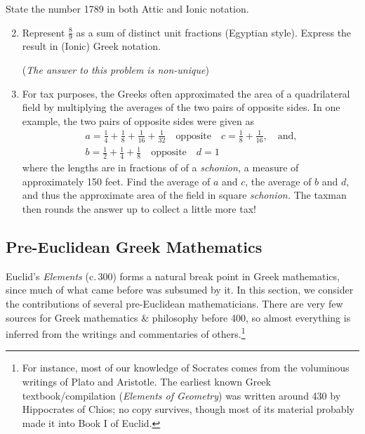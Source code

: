 \begin{exercises}{}{}
	\exstart State the number 1789 in both Attic and Ionic notation.
	\begin{enumerate}\setcounter{enumi}{1}
	  \item%
	  Represent $\frac 89$ as a sum of distinct unit fractions (Egyptian style). Express the result in (Ionic) Greek notation.\par
	  (\emph{The answer to this problem is non-unique})
	  
	  \item%
	  For tax purposes, the Greeks often approximated the area of a quadrilateral field by multiplying the averages of the two pairs of opposite sides. In one example, the two pairs of opposite sides were given as
	  \begin{gather*}
	  a=\frac 14+\frac 18+\frac 1{16}+\frac 1{32}\quad\text{opposite}\quad c=\frac 18+\frac 1{16},\quad\text{and,}\\
	  b=\frac 12+\frac 14+\frac 18\quad\text{opposite}\quad d=1
	  \end{gather*}
	  where the lengths are in fractions of of a \emph{schonion,} a measure of approximately 150 feet. Find the average of $a$ and $c$, the average of $b$ and $d$, and thus the approximate area of the field in square \emph{schonion.} The taxman then rounds the answer up to collect a little more tax!
	\end{enumerate}
\end{exercises}

\clearpage



\subsection{Pre-Euclidean Greek Mathematics}

Euclid's \emph{Elements} (c.\,300\BC) forms a natural break point in Greek mathematics, since much of what came before was subsumed by it. In this section, we consider the contributions of several pre-Euclidean mathematicians. There are very few sources for Greek mathematics \& philosophy before 400\BC{}, so almost everything is inferred from the writings and commentaries of others.\footnote{For instance, most of our knowledge of Socrates comes from the voluminous writings of Plato and Aristotle. The earliest known Greek textbook/compilation (\emph{Elements of Geometry}) was written around 430\BC{} by Hippocrates of Chios; no copy survives, though most of its material probably made it into Book I of Euclid.}\vspace{-5pt}

